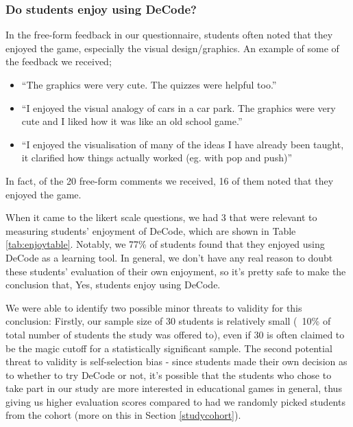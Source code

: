 \documentclass[11pt]{article}
\begin{document}
\subsubsection{Do students enjoy using DeCode?}
In the free-form feedback in our questionnaire, students often noted that they enjoyed the game, especially the visual design/graphics. An example of some of the feedback we received;
\begin{spacing}{1.5}
\begin{itemize}
  \item ``The graphics were very cute. The quizzes were helpful too.''
  \item ``I enjoyed the visual analogy of cars in a car park. The graphics were very cute and I liked how it was like an old school game.''
  \item ``I enjoyed the visualisation of many of the ideas I have already been taught, it clarified how things actually worked (eg. with pop and push)''
\end{itemize}
\end{spacing}
In fact, of the 20 free-form comments we received, 16 of them noted that they enjoyed the game.\par
When it came to the likert scale questions, we had 3 that were relevant to measuring students' enjoyment of DeCode, which are shown in Table \ref{tab:enjoytable}. Notably, we 77\% of students found that they enjoyed using DeCode as a learning tool. In general, we don't have any real reason to doubt these students' evaluation of their own enjoyment, so it's pretty safe to make the conclusion that, Yes, students enjoy using DeCode.\par
We were able to identify two possible minor threats to validity for this conclusion: Firstly, our sample size of 30 students is relatively small (~10\% of total number of students the study was offered to), even if 30 is often claimed to be the magic cutoff for a statistically significant sample. The second potential threat to validity is self-selection bias - since students made their own decision as to whether to try DeCode or not, it's possible that the students who chose to take part in our study are more interested in educational games in general, thus giving us higher evaluation scores compared to had we randomly picked students from the cohort (more on this in Section \ref{studycohort}).
\end{document}
